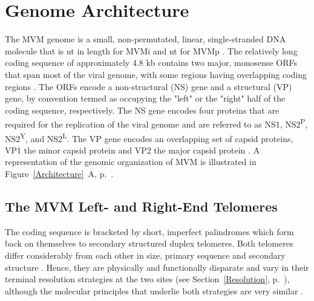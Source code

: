 
\chapter{Genome Architecture} %

\label{Chapter5} %





\label{sec: Architecture}
The MVM genome is a small, non-permutated, linear, single-stranded DNA molecule \cite{pmid789912, pmid225040, Genome1, Genome2} that is  nt in length for MVMi and  nt for MVMp \cite{pmid3502703}. The relatively long coding sequence of approximately 4.8 kb contains two major, monosense ORFs that span most of the viral genome, with some regions having overlapping coding regions \cite{pmid6298737}. The ORFs encode a non-structural (NS) gene and a structural (VP) gene, by convention termed as occupying the "left" or the "right" half of the coding sequence, respectively. The NS gene encodes four proteins that are required for the replication of the viral genome and are referred to as NS1, NS2\textsuperscript{P}, NS2\textsuperscript{Y}, and NS2\textsuperscript{L}. The VP gene encodes an overlapping set of capsid proteins, VP1 the minor capsid protein and VP2 the major capsid protein \cite{pmid6828378, pmid2939261, pmid2942705}. A representation of the genomic organization of MVM is illustrated in Figure~\ref{Architecture}~A, p.~\pageref{Architecture}.   

\section{The MVM Left- and Right-End Telomeres}        

The coding sequence is bracketed by short, imperfect palindromes which form back on themselves to secondary structured duplex telomeres. Both telomeres differ considerably from each other in size, primary sequence and secondary structure \cite{pmid6298737}. Hence, they are physically and functionally disparate and vary in their terminal resolution strategies at the two sites (see Section~\ref{Resolution}, p.~\pageref{Resolution}), although the molecular principles that underlie both strategies are very similar \cite{encapsidation}. 

